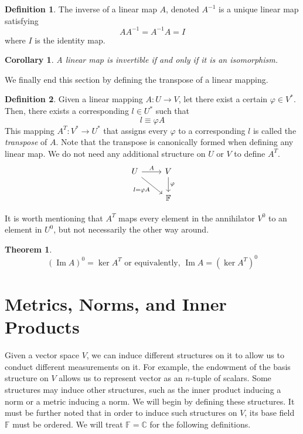 \documentclass{article}
\DeclareMathOperator{\im}{Im}
\newtheorem{theorem}{Theorem}[section]
\newtheorem{corollary}{Corollary}[theorem]
\theoremstyle{remark}
\theoremstyle{definition}
\newtheorem{definition}{Definition}[section]
\begin{document}
\begin{definition}
The inverse of a linear map $A$, denoted $A^{-1}$ is a unique linear map satisfying 
\[ A A^{-1} = A^{-1} A = I\]
where $I$ is the identity map. 
\end{definition}

\begin{corollary}
A linear map is invertible if and only if it is an isomorphism. 
\end{corollary}

We finally end this section by defining the transpose of a linear mapping. 

\begin{definition}
Given a linear mapping $A: U \longrightarrow V$, let there exist a certain $\varphi \in V^*$. Then, there exists a corresponding $l \in U^*$ such that 
\[ l \equiv \varphi A \]
This mapping $A^T: V^* \longrightarrow U^*$ that assigns every $\varphi$ to a corresponding $l$ is called the \textit{transpose} of $A$. Note that the transpose is canonically formed when defining any linear map. We do not need any additional structure on $U$ or $V$ to define $A^T$.
\[
  \begin{tikzcd}
    U \arrow{r}{A} \arrow[swap]{dr}{l = \varphi A} & V \arrow{d}{\varphi} \\
    & \mathbb{F}
  \end{tikzcd}
\]
\end{definition}

It is worth mentioning that $A^T$ maps every element in the annihilator $V^0$ to an element in $U^0$, but not necessarily the other way around. 

\begin{theorem}
\[ (\im A)^0 = \ker A^T \text{ or equivalently, } \im A = (\ker A^T)^0\]
\end{theorem}

\section{Metrics, Norms, and Inner Products} 
Given a vector space $V$, we can induce different structures on it to allow us to conduct different measurements on it. For example, the endowment of the basis structure on $V$ allows us to represent vector as an $n$-tuple of scalars. Some structures may induce other structures, such as the inner product inducing a norm or a metric inducing a norm. We will begin by defining these structures. It must be further noted that in order to induce such structures on $V$, its base field $\mathbb{F}$ must be ordered. We will treat $\mathbb{F} = \mathbb{C}$ for the following definitions. 
\end{document}
